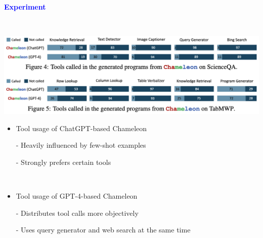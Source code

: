 \documentclass[professionalfont]{beamer}
\begin{document}
\begin{frame}

\begin{center}
    { \textbf{\textcolor{blue}{ {\fontsize{12}{14}\selectfont Experiment} }} }
\end{center}
\\[0.3cm]

\begin{center}
    \includegraphics[width=1.0\textwidth]{figure/4-5.png}
\end{center}


{\fontsize{10}{14}\selectfont 
\begin{itemize}
    \item Tool usage of ChatGPT-based Chameleon
    
    - Heavily influenced by few-shot examples

    - Strongly prefers certain tools

    \\[0.3cm]

    \item Tool usage of GPT-4-based Chameleon

    - Distributes tool calls more objectively

    - Uses query generator and web search at the same time
\end{itemize}
}

\end{frame}
\end{document}
